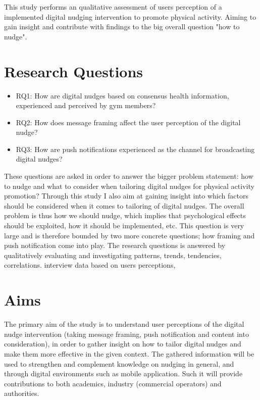 This study performs an qualitative assessment of users perception of a implemented digital nudging intervention to promote physical activity. Aiming to gain insight and contribute with findings to the big overall question "how to nudge".

\section{Research Questions}
\begin{itemize}
\item RQ1: How are digital nudges based on consensus health information, experienced and perceived by gym members? 
\item RQ2: How does message framing affect the user perception of the digital nudge?
\item RQ3: How are push notifications experienced as the channel for broadcasting digital nudges? 
\end{itemize}

These questions are asked in order to answer the bigger problem statement: how to nudge and what to consider when tailoring digital nudges for physical activity promotion? Through this study I also aim at gaining insight into which factors should be considered when it comes to tailoring of digital nudges. The overall problem is thus how we should nudge, which implies that psychological effects should be exploited, how it should be implemented, etc. This question is very large and is therefore bounded by two more concrete questions; how framing and push notification come into play. The research questions is answered by qualitatively evaluating and investigating patterns, trends, tendencies, correlations. interview data based on users perceptions,  

\section{Aims}
The primary aim of the study is to understand user perceptions of the digital nudge intervention (taking message framing, push notification and content into consideration), in order to gather insight on how to tailor digital nudges and make them more effective in the given context. The gathered information will be used to strengthen and complement knowledge on nudging in general, and through digital environments such as mobile application. Such it will provide contributions to both academics, industry (commercial operators) and authorities. 

